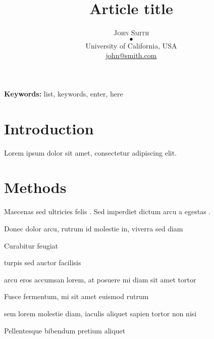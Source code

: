 \documentclass[a4paper]{article}
\title{\uppercase\vspace{5mm}\fontsize{16pt}{18pt}\selectfont\textbf{Article title}} %
\author{\large
\textsc{John Smith}\\[2mm] %
$\bullet$\\
\normalsize University of California, USA \\ %
\normalsize
\normalsize \href{mailto:john@smith.com}{john@smith.com} %
\vspace{-5mm}
}
\date{}
\theoremstyle{definition}
\begin{document}
\maketitle %
\thispagestyle{fancy} %


\begin{abstract}
\noindent \lipsum[1] %
\end{abstract}
\smallskip
\noindent \textbf{Keywords:} list, keywords, enter, here\\


\section{Introduction}

Lorem ipsum dolor sit amet, consectetur adipiscing elit.
\lipsum[2-3] %


\section{Methods}

Maecenas sed ultricies felis \cite{Figueredo:2009dg}. Sed imperdiet dictum arcu a egestas \cite{Joachim:2002}. \\
\begin{compactitem}
\item Donec dolor arcu, rutrum id molestie in, viverra sed diam
\item Curabitur feugiat
\item turpis sed auctor facilisis
\item arcu eros accumsan lorem, at posuere mi diam sit amet tortor
\item Fusce fermentum, mi sit amet euismod rutrum
\item sem lorem molestie diam, iaculis aliquet sapien tortor non nisi
\item Pellentesque bibendum pretium aliquet
\end{compactitem}

\vspace{\baselineskip}
\end{document}

